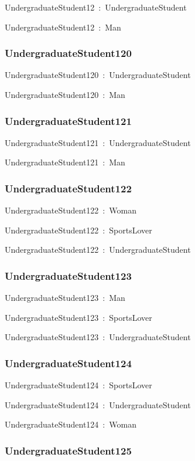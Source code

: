 \documentclass{article}
\begin{document}
UndergraduateStudent12~:~UndergraduateStudent

UndergraduateStudent12~:~Man

\subsubsection*{UndergraduateStudent120}

UndergraduateStudent120~:~UndergraduateStudent

UndergraduateStudent120~:~Man

\subsubsection*{UndergraduateStudent121}

UndergraduateStudent121~:~UndergraduateStudent

UndergraduateStudent121~:~Man

\subsubsection*{UndergraduateStudent122}

UndergraduateStudent122~:~Woman

UndergraduateStudent122~:~SportsLover

UndergraduateStudent122~:~UndergraduateStudent

\subsubsection*{UndergraduateStudent123}

UndergraduateStudent123~:~Man

UndergraduateStudent123~:~SportsLover

UndergraduateStudent123~:~UndergraduateStudent

\subsubsection*{UndergraduateStudent124}

UndergraduateStudent124~:~SportsLover

UndergraduateStudent124~:~UndergraduateStudent

UndergraduateStudent124~:~Woman

\subsubsection*{UndergraduateStudent125}
\end{document}
